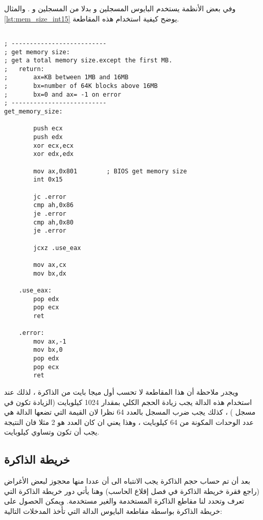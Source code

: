 \documentclass[document.tex]{subfiles}
\begin{document}
وفي بعض الأنظمة يستخدم البايوس المسجلين  و  بدلا من المسجلين  و . والمثال \ref{lst:mem_size_int15} يوضح كيفية استخدام هذه المقاطعة.

\begin{english}
\lstset{numberstyle=\tiny,numbers=left,stepnumber=1,numbersep=5pt,tabsize=2,extendedchars=true,breaklines=true,frame=b,showspaces=false, showtabs=false,xleftmargin=10pt,framexleftmargin=10pt,framexrightmargin=5pt,framexbottommargin=4pt,showstringspaces=false,language=[x86masm]Assembler}

\begin{lstlisting}[label=lst:mem_size_int15,caption=\en{Using int 0x15 Function 0xe801 to get size of memory}]

; --------------------------
; get memory size:
; get a total memory size.except the first MB. 
;	return:
;		ax=KB between 1MB and 16MB
;		bx=number of 64K blocks above 16MB
;		bx=0 and ax= -1 on error
; --------------------------		
get_memory_size:

		push ecx
		push edx
		xor ecx,ecx
		xor edx,edx
		
		mov ax,0x801		; BIOS get memory size
		int 0x15
		
		jc .error
		cmp ah,0x86
		je .error
		cmp ah,0x80
		je .error
		
		jcxz .use_eax
		
		mov ax,cx
		mov bx,dx
		
	.use_eax:
		pop edx
		pop ecx
		ret
		
	.error:
		mov ax,-1
		mov bx,0
		pop edx
		pop ecx
		ret

\end{lstlisting}
\end{english}

ويجدر ملاحظة أن هذا المقاطعة لا تحسب أول ميجا بايت من الذاكرة ، لذلك عند استخدام هذه الدالة يجب زيادة الحجم الكلي بمقدار 1024 كيلوبايت (الزيادة تكون في مسجل ) ، كذلك يجب ضرب المسجل  بالعدد 64 نظرا لان القيمة التي تضعها الدالة هي عدد الوحدات المكونة من 64 كيلوبايت ، وهذا يعني ان كان العدد هو 2 مثلا فان النتيجة يجب أن تكون  وتساوي  كيلوبايت.

\subsection{خريطة الذاكرة }
بعد أن تم حساب حجم الذاكرة يجب الانتباه الى أن عددا منها محجوز لبعض الأغراض (راجع فقرة خريطة الذاكرة في فصل إقلاع الحاسب) وهنا يأتي دور خريطة الذاكرة التي تعرف وتحدد لنا مقاطع الذاكرة المستخدمة والغير مستخدمة. ويمكن الحصول على خريطة الذاكرة بواسطة مقاطعة البايوس  الدالة  التي تأخذ المدخلات التالية:
\end{document}
